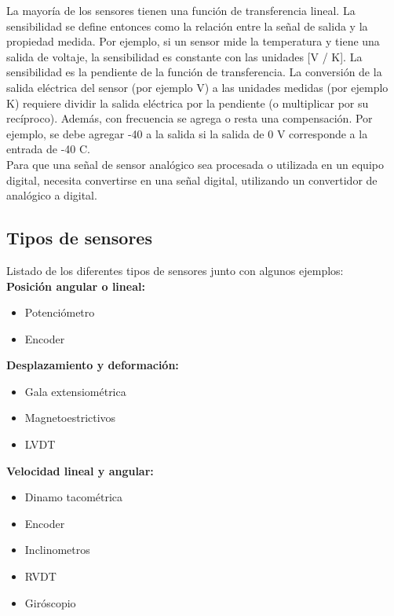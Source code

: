 La mayoría de los sensores tienen una función de transferencia lineal. La sensibilidad se define entonces como la relación entre la señal de salida y la propiedad medida. 
Por ejemplo, si un sensor mide la temperatura y tiene una salida de voltaje, la sensibilidad es constante con las unidades [V / K]. La sensibilidad es la pendiente de la función 
de transferencia. La conversión de la salida eléctrica del sensor (por ejemplo V) a las unidades medidas (por ejemplo K) requiere dividir la salida eléctrica por la pendiente 
(o multiplicar por su recíproco). Además, con frecuencia se agrega o resta una compensación. Por ejemplo, se debe agregar -40 a la salida si la salida de 0 V corresponde a la 
entrada de -40 \textdegree C.\\

Para que una señal de sensor analógico sea procesada o utilizada en un equipo digital, necesita convertirse en una señal digital, utilizando un convertidor de analógico a 
digital.


\subsection{Tipos de sensores}

Listado de los diferentes tipos de sensores junto con algunos ejemplos:\\

\textbf{Posición angular o lineal:}
\begin{itemize}
 \item Potenciómetro
 \item Encoder
\end{itemize}

\textbf{Desplazamiento y deformación:}
\begin{itemize}
 \item Gala extensiométrica
 \item Magnetoestrictivos
 \item LVDT
\end{itemize}

\textbf{Velocidad lineal y angular:}
\begin{itemize}
  \item     Dinamo tacométrica
  \item     Encoder
  \item     Inclinometros
  \item     RVDT
  \item     Giróscopio
\end{itemize}

